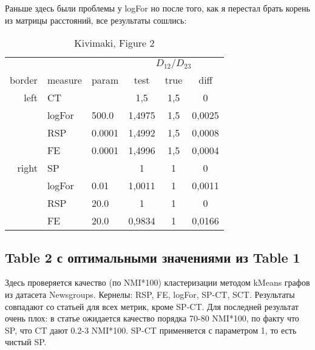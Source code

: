 \documentclass{article}
\begin{document}
Раньше здесь были проблемы у logFor но после того, как я перестал брать корень из матрицы расстояний, все результаты сошлись:

\begin{table}[H]
\centering
\caption{Kivimaki, Figure 2}
\label{my-label}
\begin{tabular}{rll|cc|c}
       &         &        & \multicolumn{3}{c}{$D_{12} / D_{23}$} \\
border & measure & param  & test   & true & diff   \\
       \hline
left   & CT      &        & 1,5    & 1,5  & 0      \\
       & logFor  & 500.0  & 1,4975 & 1,5  & 0,0025 \\
       & RSP     & 0.0001 & 1,4992 & 1,5  & 0,0008 \\
       & FE      & 0.0001 & 1,4996 & 1,5  & 0,0004 \\
       \hline
right  & SP      &        & 1      & 1    & 0      \\
       & logFor  & 0.01   & 1,0011 & 1    & 0,0011 \\
       & RSP     & 20.0   & 1      & 1    & 0      \\
       & FE      & 20.0   & 0,9834 & 1    & 0,0166
\end{tabular}
\end{table}

\subsection{Table 2 с оптимальными значениями из Table 1}
Здесь проверяется качество (по NMI*100) кластеризации методом kMeans графов из датасета Newsgroups. Кернелы: RSP, FE, logFor, SP-CT, SCT. Результаты совпадают со статьей для всех метрик, кроме SP-CT. Для последней результат очень плох: в статье ожидается качество порядка 70-80 NMI*100, по факту что SP, что CT дают 0.2-3 NMI*100. SP-CT применяется с параметром 1, то есть чистый SP.
\end{document}
